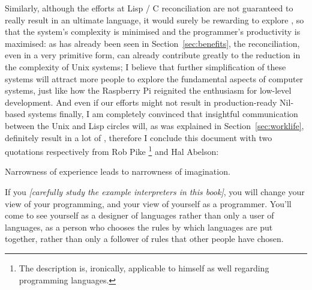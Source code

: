 Similarly, although the efforts at Lisp / C reconciliation are not guaranteed
to really result in an ultimate language, it would surely be rewarding to
explore , so that the
system's complexity is minimised and the programmer's productivity is maximised:
as has already been seen in Section~\ref{sec:benefits}, the reconciliation, even
in a very primitive form, can already contribute greatly to the reduction in the
complexity of Unix systems; I believe that further simplification of these
systems will attract more people to explore the fundamental aspects of computer
systems, just like how the Raspberry Pi reignited the enthusiasm for low-level
development.  And even if our efforts might not result in production-ready
Nil-based systems finally, I am completely convinced that insightful
communication between the Unix and Lisp circles will, as was explained in
Section~\ref{sec:worklife}, definitely result in a lot of , therefore I conclude this document
with two quotations respectively from Rob Pike%
\footnote{The description is, ironically, applicable to himself as well
regarding programming languages.} and Hal Abelson:
\begin{quoting}
	Narrowness of experience leads to narrowness of imagination.
\end{quoting}
\colskipc
\begin{quoting}
	If you \emph{[carefully study the example interpreters in this book]},
	you will change your view of your programming, and your view of
	yourself as a programmer.  You'll come to see yourself as a designer
	of languages rather than only a user of languages, as a person
	who chooses the rules by which languages are put together, rather
	than only a follower of rules that other people have chosen.
\end{quoting}

